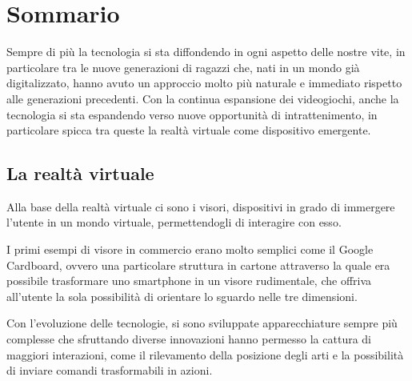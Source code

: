 \chapter*{Sommario}
\label{cha:sommario}

Sempre di più la tecnologia si sta diffondendo in ogni aspetto delle nostre vite,
in particolare tra le nuove generazioni di ragazzi che, nati in un mondo già
digitalizzato, hanno avuto un approccio molto più naturale e immediato rispetto alle
generazioni precedenti. Con la continua espansione dei videogiochi, anche la tecnologia
si sta espandendo verso nuove opportunità di intrattenimento, in particolare
spicca tra queste la realtà virtuale come dispositivo emergente.

\section*{La realtà virtuale}
\label{sec:la-realta-virtuale}

Alla base della realtà virtuale ci sono i visori, dispositivi in grado di
immergere l'utente in un mondo virtuale, permettendogli di interagire con esso.

I primi esempi di visore in commercio erano molto semplici come il Google Cardboard,
ovvero una particolare struttura in cartone attraverso la quale era possibile
trasformare uno smartphone in un visore rudimentale, che offriva all'utente la sola
possibilità di orientare lo sguardo nelle tre dimensioni.

Con l'evoluzione delle tecnologie, si sono sviluppate apparecchiature sempre più
complesse che sfruttando diverse innovazioni hanno permesso la cattura di
maggiori interazioni, come il rilevamento della posizione degli arti e la possibilità
di inviare comandi trasformabili in azioni.

